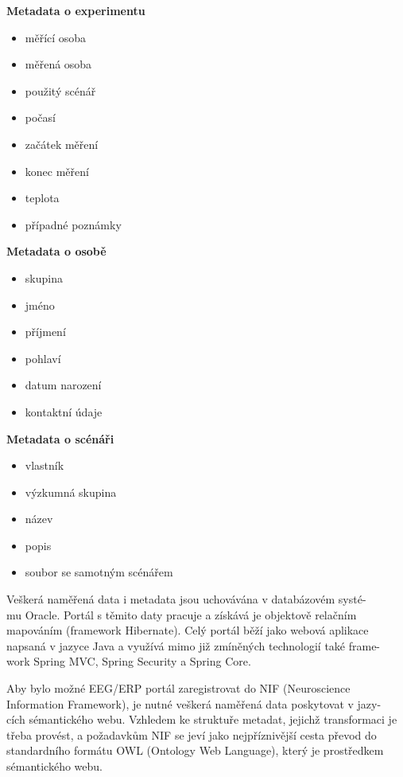 \documentclass{projekt}
\begin{document}
\textbf{Metadata o experimentu}
\begin {itemize}
\item měřící osoba
\item měřená osoba
\item použitý scénář
\item počasí
\item začátek měření
\item konec měření
\item teplota
\item případné poznámky
\end{itemize}

\textbf{Metadata o osobě}
\begin {itemize}
\item skupina
\item jméno
\item příjmení
\item pohlaví
\item datum narození
\item kontaktní údaje
\end{itemize}

\textbf{Metadata o scénáři}
\begin {itemize}
\item vlastník
\item výzkumná skupina
\item název
\item popis
\item soubor se samotným scénářem
\end{itemize}

\vspace{1cm}
Veškerá naměřená data i metadata jsou uchovávána v databázovém systé-\\mu Oracle. Portál s těmito daty pracuje a získává je objektově relačním mapováním (framework Hibernate). Celý portál běží jako webová aplikace napsaná v jazyce Java a využívá mimo již zmíněných technologií také frame-\\work Spring MVC, Spring Security a Spring Core.


Aby bylo možné EEG/ERP portál zaregistrovat do NIF (Neuroscience Information Framework), je nutné veškerá naměřená data poskytovat v jazy-\\cích sémantického webu. 
Vzhledem ke struktuře metadat, jejichž transformaci je třeba provést, a požadavkům NIF se jeví jako nejpříznivější cesta převod do standardního formátu OWL (Ontology Web Language), který je prostředkem sémantického webu.
\end{document}
